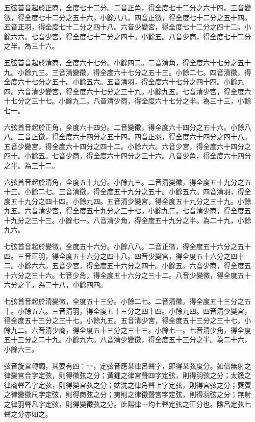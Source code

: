 \begin{pinyinscope}
五弦首音起於正商，全度七十二分。二音正角，得全度七十二分之六十四。三音變徵，得全度七十二分之五十六。小餘八八。四音正徵，得全度七十二分之五十四。五音正羽，得全度七十二分之四十八。六音少變宮，得全度七十二分之四十二。小餘六六。七音少宮，得全度七十二分之四十。小餘五。八音少商，得全度七十二分之半。為三十六。

五弦首音起於清商，全度六十七分。小餘四二。二音清角，得全度六十七分之五十九。小餘九三。三音清變徵，得全度六十七分之五十三。小餘二七。四音清徵，得全度六十七分之五十。小餘五六。五音清羽，得全度六十七分之四十四。小餘九四。六音清少變宮，得全度六十七分之三十九。小餘九五。七音清少宮，得全度六十七分之三十七。小餘九二。八音清少商，得全度六十七分之半。為三十三，小餘七一。

六弦首音起於正角，全度六十四分。二音變徵，得全度六十四分之五十六。小餘八八。三音正徵，得全度六十四分之五十四。四音正羽，得全度六十四分之四十八。五音少變宮，得全度六十四分之四十二。小餘六六。六音少宮，得全度六十四分之四十。小餘五。七音少商，得全度六十四分之三十六。八音少角，得全度六十四分之半。為三十二。

六弦首音起於清角，全度五十九分。小餘九三。二音清變徵，得全度五十九分之五十三。小餘二七。三音清徵，得全度五十九分之五十。小餘五六。四音清羽，得全度五十九分之四十四。小餘九四。五音清少變宮，得全度五十九分之三十九。小餘九五。六音清少宮，得全度五十九分之三十七。小餘九二。七音清少商，得全度五十九分之三十三。小餘七一。八音清少角，得全度五十九分之半。為二十九，小餘九六。

七弦首音起於變徵，全度五十六分。小餘八八。二音正徵，得全度五十六分之五十四。三音正羽，得全度五十六分之四十八。四音少變宮，得全度五十六分之四十二。小餘六六。五音少宮，得全度五十六分之四十。小餘五。六音少商，得全度五十六分之三十六。七音少角，得全度五十六分之三十二。八音少變徵，得全度五十六分之半。為二十八，小餘四四。

七弦首音起於清變徵，全度五十三分。小餘二七。二音清徵，得全度五十三分之五十。小餘五六。三音清羽，得全度五十三分之四十四。小餘九四。四音清少變宮，得全度五十三分之三十七。小餘九五。五音清少宮，得全度五十三分之三十七。小餘九二。六音清少商，得全度五十三分之三十三。小餘七一。七音清少角，得全度五十三分之二十九。小餘九六。八音清少變徵，得全度五十三分之半。為二十六，小餘六三。

弦音旋宮轉調，其要有四：一，定弦音應某律呂聲字，即得某弦度分。如倍無射之律變宮合字定弦，則得徵弦之分；黃鍾之律宮聲四字定弦，則得羽弦之分；太簇之律商聲乙字定弦，則得變宮弦之分；姑洗之律角聲上字定弦，則得宮弦之分；蕤賓之律變徵尺字定弦，則得商弦之分；夷則之律徵聲宮字定弦，則得羽弦之分；無射之律羽聲凡字定弦，則得變徵弦之分。此陽律一均七聲定弦之正分也。陰呂定弦七聲之分亦如之。


\end{pinyinscope}
